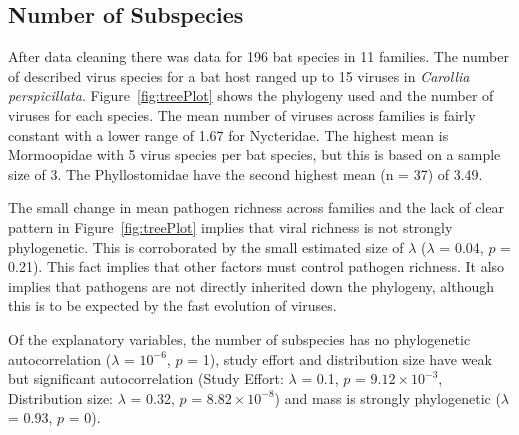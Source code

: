 
\subsection{Number of Subspecies}

After data cleaning there was data for 196 bat species in 11 families.
The number of described virus species for a bat host ranged up to 15 viruses in \emph{Carollia perspicillata}.
Figure~\ref{fig:treePlot} shows the phylogeny used and the number of viruses for each species.
The mean number of viruses across families is fairly constant with a lower range of 1.67 for Nycteridae.
The highest mean is Mormoopidae with 5 virus species per bat species, but this is based on a sample size of 3.
The Phyllostomidae have the second highest mean (n = 37) of 3.49.

The small change in mean pathogen richness across families and the lack of clear pattern in Figure~\ref{fig:treePlot} implies that viral richness is not strongly phylogenetic. 
This is corroborated by the small estimated size of $\lambda$ ($\lambda$ = 0.04, $p$ = 0.21).
This fact implies that other factors must control pathogen richness.
It also implies that pathogens are not directly inherited down the phylogeny, although this is to be expected by the fast evolution of viruses.

Of the explanatory variables, the number of subspecies has no phylogenetic autocorrelation ($\lambda$ = \ensuremath{10^{-6}}, $p$ = 1), study effort and distribution size have weak but significant autocorrelation (Study Effort: $\lambda$ = 0.1, $p$ = \ensuremath{9.12\times 10^{-3}}, Distribution size: $\lambda$ = 0.32, $p$ = \ensuremath{8.82\times 10^{-8}}) and mass is strongly phylogenetic ($\lambda$ = 0.93, $p$ = 0).


